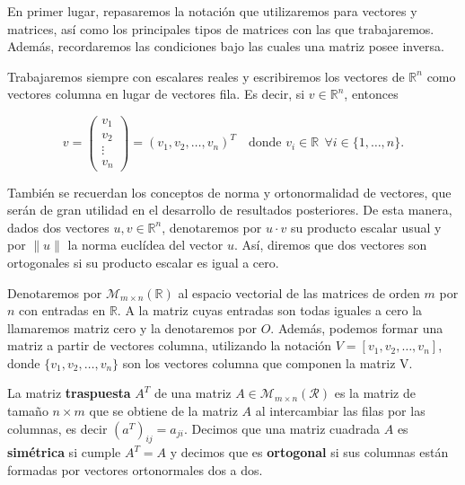En primer lugar, repasaremos la notación que utilizaremos para vectores y matrices, así como los principales tipos de matrices con las que trabajaremos. Además, recordaremos las condiciones bajo las cuales una matriz posee inversa.\newline

Trabajaremos siempre con escalares reales y escribiremos los vectores de $\mathbb{R}^{n}$ como vectores columna en lugar de vectores fila. Es decir, si $v \in \mathbb{R}^{n}$, entonces

\[ 
    v = \begin{pmatrix} 
        v_{1} \\ 
        v_{2} \\ 
        \vdots \\
        v_{n}
    \end{pmatrix} = {(v_{1}, v_{2}, \ldots, v_{n})}^{T} \quad \text{donde } v_i \in \mathbb{R} \ \ \forall i \in \{1, \ldots, n \}.
\]

También se recuerdan los conceptos de norma y ortonormalidad de vectores, que serán de gran utilidad en el desarrollo de resultados posteriores. De esta manera, dados dos vectores $u, v \in \mathbb{R}^{n}$, denotaremos por $u \cdot v$ su producto escalar usual y por $\| u \|$ la norma euclídea del vector $u$. Así, diremos que dos vectores son ortogonales si su producto escalar es igual a cero.\newline

Denotaremos por $\mathcal{M}_{m \times n}(\mathbb{R})$ al espacio vectorial de las matrices de orden $m$ por $n$ con entradas en $\mathbb{R}$. A la matriz cuyas entradas son todas iguales a cero la llamaremos matriz cero y la denotaremos por $O$. Además, podemos formar una matriz a partir de vectores columna, utilizando la notación $V = [v_1, v_2, \ldots, v_n]$, donde $\{v_1, v_2, \ldots, v_n\}$ son los vectores columna que componen la matriz V.\newline

\begin{definicion}
    La matriz \textbf{traspuesta} $A^{T}$ de una matriz $A \in \mathcal{M}_{m \times n}(\mathcal{R})$ es la matriz de tamaño $n \times m$ que se obtiene de la matriz $A$ al intercambiar las filas por las columnas, es decir $(a^{T})_{ij} = a_{ji}$. Decimos que una matriz cuadrada $A$ es \textbf{simétrica} si cumple $A^{T} = A$ y decimos que es \textbf{ortogonal} si sus columnas están formadas por vectores ortonormales dos a dos.\newline
\end{definicion}

